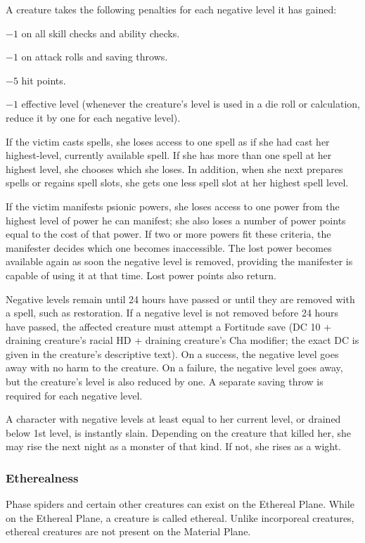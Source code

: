 A creature takes the following penalties for each negative level it has gained:

\begin{itemize*}
\item $-1$ on all skill checks and ability checks.
\item $-1$ on attack rolls and saving throws.
\item $-5$ hit points.
\item $-1$ effective level (whenever the creature's level is used in a die roll or calculation, reduce it by one for each negative level).
\item If the victim casts spells, she loses access to one spell as if she had cast her highest-level, currently available spell. If she has more than one spell at her highest level, she chooses which she loses. In addition, when she next prepares spells or regains spell slots, she gets one less spell slot at her highest spell level.
\item If the victim manifests psionic powers, she loses access to one power from the highest level of power he can manifest; she also loses a number of power points equal to the cost of that power. If two or more powers fit these criteria, the manifester decides which one becomes inaccessible. The lost power becomes available again as soon the negative level is removed, providing the manifester is capable of using it at that time. Lost power points also return.
\end{itemize*}

Negative levels remain until 24 hours have passed or until they are removed with a spell, such as restoration. If a negative level is not removed before 24 hours have passed, the affected creature must attempt a Fortitude save (DC 10 + \onehalf draining creature's racial HD + draining creature's Cha modifier; the exact DC is given in the creature's descriptive text). On a success, the negative level goes away with no harm to the creature. On a failure, the negative level goes away, but the creature's level is also reduced by one. A separate saving throw is required for each negative level.

A character with negative levels at least equal to her current level, or drained below 1st level, is instantly slain. Depending on the creature that killed her, she may rise the next night as a monster of that kind. If not, she rises as a wight.

\subsubsection{Etherealness}
Phase spiders and certain other creatures can exist on the Ethereal Plane. While on the Ethereal Plane, a creature is called ethereal. Unlike incorporeal creatures, ethereal creatures are not present on the Material Plane.

